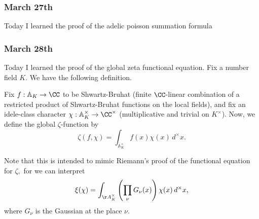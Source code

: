 \subsubsection{March 27th}
Today I learned the proof of the adelic poisson summation formula\todo{}

\subsubsection{March 28th}
Today I learned the proof of the global zeta functional equation. Fix a number field $K.$ We have the following definition.
\begin{definition}
    Fix $f:\mathbb A_K\to\CC$ to be Shwartz-Bruhat (finite $\CC$-linear combination of a restricted product of Shwartz-Bruhat functions on the local fields), and fix an idele-class character $\chi:\mathbb A_K^\times\to\CC^\times$ (multiplicative and trivial on $K^\times$). Now, we define the global $\zeta$-function by
    \[\zeta(f,\chi)=\int_{\mathbb A^\times_K}f(x)\chi(x)\,d^\times x.\]
\end{definition}
Note that this is intended to mimic Riemann's proof of the functional equation for $\zeta,$ for we can interpret
\[\xi(\chi)=\int_{\AA^\times_K}\left(\prod_\nu G_\nu(x)\right)\chi(x)\,d^\times x,\]
where $G_\nu$ is the Gaussian at the place $\nu.$

